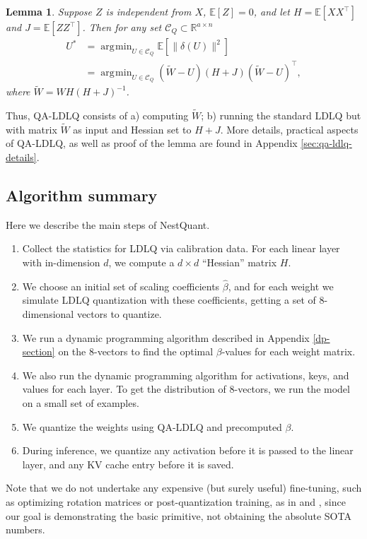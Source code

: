 \documentclass{article}
\newcommand{\RR}{\mathbb{R}}
\def\EE{\mathbb{E}}
\DeclareMathOperator*{\argmin}{\arg\!\min}
\theoremstyle{plain}
\newtheorem{lemma}[theorem]{Lemma}
\theoremstyle{definition}
\theoremstyle{remark}
\begin{document}
\begin{lemma}
    Suppose $Z$ is independent from $X$, $\EE[Z] = 0$, and let $H=\EE[XX^\top]$ and $J=\EE[Z Z^\top]$. Then for any set $\mathcal{C}_{Q}\subset\RR^{a\times n}$
    \begin{align}
        U^* &= \argmin_{U\in \mathcal{C}_{Q}}\EE[\|\delta(U)\|^2] \nonumber\\
        &= \argmin_{U\in \mathcal{C}_{Q}} (\tilde{W}-U)(H+J)(\tilde{W}-U)^\top,
    \end{align}
    where $\tilde{W}=WH(H+J)^{-1}$.
    \label{lemma:qa-ldlq}
\end{lemma}

Thus, QA-LDLQ consists of a) computing $\tilde{W}$; b) running the standard LDLQ but with matrix $\tilde{W}$ as input and Hessian set to $H+J$.  More details, practical aspects of QA-LDLQ, as well as proof of the lemma are found in Appendix \ref{sec:qa-ldlq-details}.

\subsection{Algorithm summary}
\label{algo-summary}

Here we describe the main steps of NestQuant.

\begin{enumerate}
    \item Collect the statistics for LDLQ via calibration data. For each linear layer with in-dimension $d$, we compute a $d \times d$ ``Hessian'' matrix $H$.
    \item We choose an initial set of scaling coefficients $\hat{\beta}$, and for each weight we simulate LDLQ quantization with these coefficients, getting a set of 8-dimensional vectors to quantize.
    \item We run a dynamic programming algorithm described in Appendix \ref{dp-section} on the 8-vectors to find the optimal $\beta$-values for each weight matrix.
    \item We also run the dynamic programming algorithm for activations, keys, and values for each layer. To get the distribution of 8-vectors, we run the model on a small set of examples.
    \item We quantize the weights using QA-LDLQ and precomputed $\beta$.
    \item During inference, we quantize any activation before it is passed to the linear layer, and any KV cache entry before it is saved.
\end{enumerate}
Note that we do not undertake any expensive (but surely useful) fine-tuning, such as optimizing rotation matrices or post-quantization training, as in \cite{liu2024} and \cite{tseng2024}, since our goal is demonstrating the basic primitive, not obtaining the absolute SOTA numbers.
\end{document}
